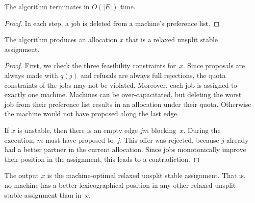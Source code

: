 \documentclass{llncs}
\begin{document}
\begin{claim}
The algorithm terminates in $O(|E|)$ time.
\end{claim}

\begin{proof}
In each step, a job is deleted from a machine's preference
list. 
\end{proof}

\begin{claim}
The algorithm produces an allocation $x$ that is a relaxed unsplit
stable assignment.
\end{claim}

\begin{proof}
First, we check the three feasibility constraints for~$x$. Since
proposals are always made with $q(j)$ and refusals are always full
rejections, the quota constraints of the jobs may not be
violated. Moreover, each job is assigned to exactly one
machine. Machines can be over-capacitated, but deleting the worst job
from their preference list results in an allocation under their quota. Otherwise the machine would not have proposed along
the last edge.
	
If $x$ is unstable, then there is an empty edge $jm$
blocking~$x$. During the execution, $m$ must have proposed
to~$j$. This offer was rejected, because $j$ already had a better
partner in the current allocation. Since jobs monotonically improve
their position in the assignment, this leads to a contradiction.
\end{proof}

\begin{claim}
The output $x$ is the machine-optimal relaxed unsplit stable
assignment. That is, no machine has a better lexicographical position
in any other relaxed unsplit stable assignment than in~$x$.
\end{claim}
\end{document}
